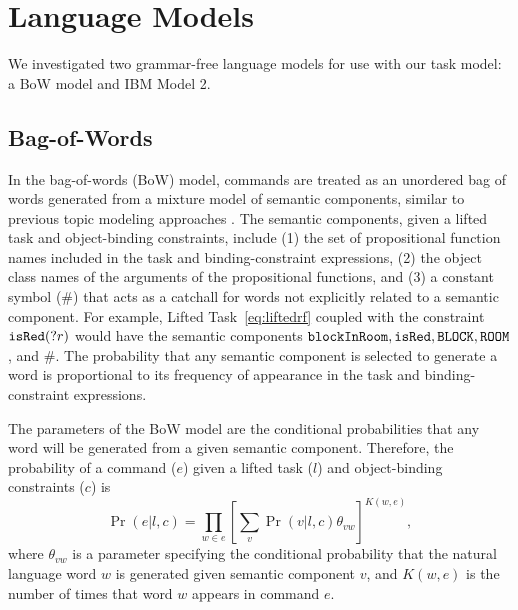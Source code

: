 \documentclass[conference]{IEEEtran}
\begin{document}

\section{Language Models} 
\label{section:lm}

We investigated two grammar-free language models for use with our task model: a BoW model and IBM Model 2.

\subsection{Bag-of-Words}
In the bag-of-words (BoW) model, commands are treated as an unordered bag of words generated from a mixture model of semantic components, similar to previous topic modeling approaches \cite{McCallum:1999vn}. The semantic components, given a lifted task and object-binding constraints, include (1) the set of propositional function names included in the task and binding-constraint expressions, (2) the object class names of the arguments of the propositional functions, and (3) a constant symbol ($\#$) that acts as a catchall for words not explicitly related to a semantic component. For example, Lifted Task~\ref{eq:liftedrf} coupled with the constraint ${\tt isRed}(?r)$ would have the semantic components ${\tt blockInRoom}, {\tt isRed}, {\tt BLOCK}, {\tt ROOM}$, and $\#$. The probability that any semantic component is selected to generate a word is proportional to its frequency of appearance in the task and binding-constraint expressions.

The parameters of the BoW model are the conditional probabilities that any word will be generated from a given semantic component. Therefore, the probability of a command ($e$) given a lifted task ($l$) and object-binding constraints ($c$) is
\begin{equation}
\Pr(e | l, c)  = \prod_{w \in e} \left[ \sum_v \Pr(v | l, c) \theta_{vw} \right]^{K(w, e)},
\end{equation}
where $\theta_{vw}$ is a parameter specifying the conditional probability that the natural language word $w$ is generated given semantic component $v$, and $K(w, e)$ is the number of times that word $w$ appears in command $e$.

\end{document}
